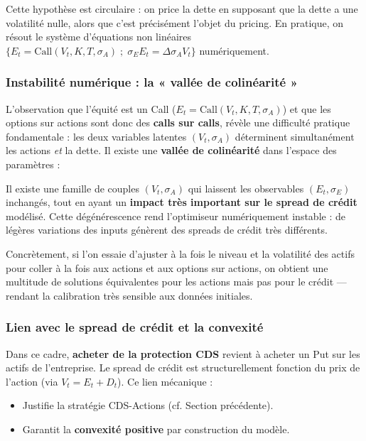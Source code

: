\begin{remarque}
Cette hypothèse est circulaire : on price la dette en supposant que la dette a une volatilité nulle, alors que c'est précisément l'objet du pricing. En pratique, on résout le système d'équations non linéaires $\{E_t = \text{Call}(V_t, K, T, \sigma_A)\; ; \; \sigma_E E_t = \Delta \sigma_A V_t\}$ numériquement.
\end{remarque}

\subsubsection*{Instabilité numérique : la « vallée de colinéarité »}

L'observation que l'équité est un Call ($E_t = \text{Call}(V_t, K, T, \sigma_A)$) et que les options sur actions sont donc des \textbf{calls sur calls}, révèle une difficulté pratique fondamentale : les deux variables latentes $(V_t, \sigma_A)$ déterminent simultanément les actions \textit{et} la dette. Il existe une \textbf{vallée de colinéarité} dans l'espace des paramètres :

\begin{tcolorbox}[colback=red!5,colframe=red!50,title=Problème de colinéarité]
Il existe une famille de couples $(V_t, \sigma_A)$ qui laissent les observables $(E_t, \sigma_E)$ inchangés, tout en ayant un \textbf{impact très important sur le spread de crédit} modélisé. Cette dégénérescence rend l'optimiseur numériquement instable : de légères variations des inputs génèrent des spreads de crédit très différents.
\end{tcolorbox}

Concrètement, si l'on essaie d'ajuster à la fois le niveau et la volatilité des actifs pour coller à la fois aux actions et aux options sur actions, on obtient une multitude de solutions équivalentes pour les actions mais pas pour le crédit — rendant la calibration très sensible aux données initiales.

\subsubsection{Lien avec le spread de crédit et la convexité}

Dans ce cadre, \textbf{acheter de la protection CDS} revient à acheter un Put sur les actifs de l'entreprise. Le spread de crédit est structurellement fonction du prix de l'action (via $V_t = E_t + D_t$). Ce lien mécanique :
\begin{itemize}
    \item Justifie la stratégie CDS-Actions (cf. Section précédente).
    \item Garantit la \textbf{convexité positive} par construction du modèle.
\end{itemize}

